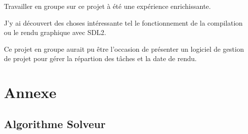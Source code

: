 \documentclass[12pt]{article}
\begin{document}
Travailler en groupe sur ce projet à été une expérience enrichissante.

J'y ai découvert des choses intéressante tel le fonctionnement de la compilation ou le rendu graphique avec SDL2.

Ce projet en groupe aurait pu être l'occasion de présenter un logiciel de gestion de projet pour gérer la répartion des tâches et la date de rendu.






\section{Annexe}
\subsection{Algorithme Solveur}
\label{algosolv}

\end{document}
